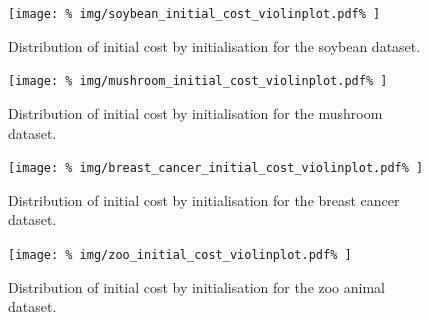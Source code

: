 \begin{table}
    \centering
    \resizebox{\textwidth}{!}{%
        
    }
    \label{tab:breast_cancer_summary}\vspace{20pt}

    \resizebox{\textwidth}{!}{%
        
    }
    \label{tab:mushroom_summary}\vspace{20pt}

    \resizebox{\textwidth}{!}{%
        
    }
    \label{tab:soybean_summary}\vspace{20pt}

    \resizebox{\textwidth}{!}{%
        
    }
    \label{tab:zoo_summary}
\end{table}



\begin{figure}
    \centering
    \texttt{[image: \%
        img/soybean\_initial\_cost\_violinplot.pdf\%
    ]}\caption{Distribution of initial cost by initialisation for the soybean
              dataset.}
\end{figure}

\begin{figure}
    \centering
    \texttt{[image: \%
        img/mushroom\_initial\_cost\_violinplot.pdf\%
    ]}\caption{Distribution of initial cost by initialisation for the mushroom
              dataset.}
\end{figure}

\begin{figure}
    \centering
    \texttt{[image: \%
        img/breast\_cancer\_initial\_cost\_violinplot.pdf\%
    ]}\caption{Distribution of initial cost by initialisation for the breast
              cancer dataset.}
\end{figure}

\begin{figure}
    \centering
    \texttt{[image: \%
        img/zoo\_initial\_cost\_violinplot.pdf\%
    ]}\caption{Distribution of initial cost by initialisation for the zoo animal
              dataset.}
\end{figure}


